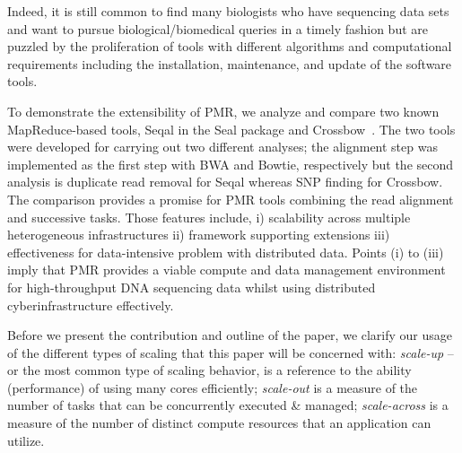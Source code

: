 \documentclass{acm_proc_article-sp}
\begin{document}
Indeed, it is still common to find many biologists who have sequencing
data sets and want to pursue biological/biomedical queries in a
timely fashion but are puzzled by the proliferation of tools with
different algorithms and computational requirements including the
installation, maintenance, and update of the software tools.


To demonstrate the extensibility of PMR, we analyze and compare two
known MapReduce-based tools, Seqal in the Seal package and
Crossbow~\cite{seal2011,langmead2010}.  The two tools were developed
for carrying out two different analyses; the alignment step was
implemented as the first step with BWA and Bowtie, respectively but
the second analysis is duplicate read removal for Seqal whereas SNP
finding for Crossbow.  The comparison provides a promise for PMR tools
combining the read alignment and successive tasks.  Those features
include, i) scalability across multiple heterogeneous infrastructures
ii) framework supporting extensions iii) effectiveness for
data-intensive problem with distributed data. Points (i) to (iii)
imply that PMR provides a viable compute and data management
environment for high-throughput DNA sequencing data whilst using
distributed cyberinfrastructure effectively.


Before we present the contribution and outline of the paper, we
clarify our usage of the different types of scaling that this paper
will be concerned with: {\it scale-up} -- or the most common type of
scaling behavior, is a reference to the ability (performance) of using
many cores efficiently; {\it scale-out} is a measure of the number of
tasks that can be concurrently executed \& managed; {\it scale-across}
is a measure of the number of distinct compute resources that an
application can utilize.


\end{document}
